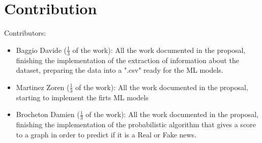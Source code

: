 \documentclass[11pt,a4paper]{article}
\begin{document}
\newpage

\section*{Contribution}
Contributors:
\begin{itemize}
	\setlength\itemsep{-0.3em}
	\item Baggio Davide ($\frac{1}{3}$ of the work): All the work documented in the proposal, finishing the implementation of the extraction of information about the dataset, preparing the data into a ".csv" ready for the ML models.
	\item Martinez Zoren ($\frac{1}{3}$ of the work): All the work documented in the proposal, starting to implement the firts ML models
	\item Brocheton Damien ($\frac{1}{3}$ of the work): All the work documented in the proposal, finishing the implementation of the probabilistic algorithm that gives a score to a graph in order to predict if it is a Real or Fake news.
\end{itemize}
\end{document}
